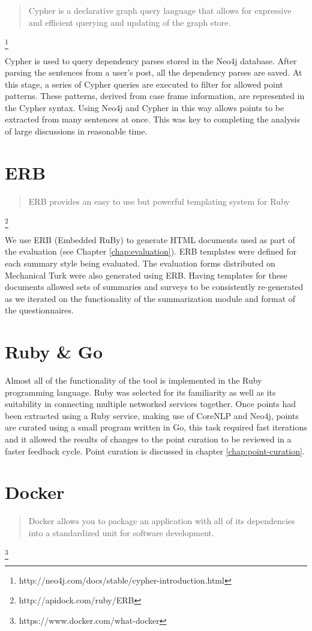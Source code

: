     \blockquote{Cypher is a declarative graph query language that allows for expressive and efficient querying and updating of the graph store.}\footnote{http://neo4j.com/docs/stable/cypher-introduction.html}

    Cypher is used to query dependency parses stored in the Neo4j database. After parsing the sentences from a user's post, all the dependency parses are saved. At this stage, a series of Cypher queries are executed to filter for allowed point patterns. These patterns, derived from case frame information, are represented in the Cypher syntax. Using Neo4j and Cypher in this way allows points to be extracted from many sentences at once. This was key to completing the analysis of large discussions in reasonable time.

  \tocless\section{ERB}
    \blockquote{ERB provides an easy to use but powerful templating system for Ruby}\footnote{http://apidock.com/ruby/ERB}

    We use ERB (Embedded RuBy) to generate HTML documents used as part of the evaluation (see Chapter \ref{chap:evaluation}). ERB templates were defined for each summary style being evaluated. The evaluation forms distributed on Mechanical Turk were also generated using ERB. Having templates for these documents allowed sets of summaries and surveys to be consistently re-generated as we iterated on the functionality of the summarization module and format of the questionnaires.

  \tocless\section{Ruby \& Go}
    Almost all of the functionality of the tool is implemented in the Ruby programming language. Ruby was selected for its familiarity as well as its suitability in connecting multiple networked services together. Once points had been extracted using a Ruby service, making use of CoreNLP and Neo4j, points are curated using a small program written in Go, this task required fast iterations and it allowed the results of changes to the point curation to be reviewed in a faster feedback cycle. Point curation is discussed in chapter \ref{chap:point-curation}.

  \tocless\section{Docker}
    \blockquote{Docker allows you to package an application with all of its dependencies into a standardized unit for software development.}\footnote{https://www.docker.com/what-docker}

